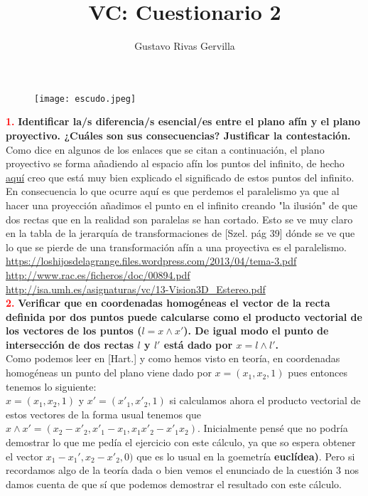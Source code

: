 \documentclass[10pt,a4paper]{article}
\author{Gustavo Rivas Gervilla}
\title{\textbf{VC: Cuestionario 2}}
\date{}
\begin{document}
\maketitle

\begin{figure}[H]
\centering
\texttt{[image: escudo.jpeg]}
\end{figure}

\newpage

\textcolor{red}{\textbf{1.}} \textbf{Identificar la/s diferencia/s esencial/es entre el plano afín y el plano proyectivo. ¿Cuáles son sus consecuencias? Justificar la contestación.}\\

Como dice en algunos de los enlaces que se citan a continuación, el plano proyectivo se forma añadiendo al espacio afín los puntos del infinito, de hecho \href{http://www.rac.es/ficheros/doc/00894.pdf}{aquí} creo que está muy bien explicado el significado de estos puntos del infinito.\\

En consecuencia lo que ocurre aquí es que perdemos el paralelismo ya que al hacer una proyección añadimos el punto en el infinito creando "la ilusión" de que dos rectas que en la realidad son paralelas se han cortado. Esto se ve muy claro en la tabla de la jerarquía de transformaciones de [Szel. pág 39] dónde se ve que lo que se pierde de una transformación afín a una proyectiva es el paralelismo.\\

\url{https://loshijosdelagrange.files.wordpress.com/2013/04/tema-3.pdf}\\
\url{http://www.rac.es/ficheros/doc/00894.pdf}\\
\url{http://isa.umh.es/asignaturas/vc/13-Vision3D_Estereo.pdf}\\

\textcolor{red}{\textbf{2.}} \textbf{Verificar que en coordenadas homogéneas el vector de la recta definida por dos puntos puede calcularse como el producto vectorial de los vectores de los puntos ($l=x \wedge x'$). De igual modo el punto de intersección de dos rectas $l$ y $l'$ está dado por $x=l \wedge l'$.}\\

Como podemos leer en [Hart.] y como hemos visto en teoría, en coordenadas homogéneas un punto del plano viene dado por $x = (x_1, x_2, 1)$ pues entonces tenemos lo siguiente:\\

$x=(x_1,x_2,1)$ y $x'=(x'_1,x'_2,1)$ si calculamos ahora el producto vectorial de estos vectores de la forma usual tenemos que $x \wedge x' = (x_2-x'_2,x'_1-x_1, x_1x'_2-x'_1x_2)$. Inicialmente pensé que no podría demostrar lo que me pedía el ejercicio con este cálculo, ya que so espera obtener el vector $x_1-x_1',x_2-x'_2,0)$ que es lo usual en la goemetría \textbf{euclídea)}. Pero si recordamos algo de la teoría dada o bien vemos el enunciado de la cuestión 3 nos damos cuenta de que sí que podemos demostrar el resultado con este cálculo.\\
\end{document}
